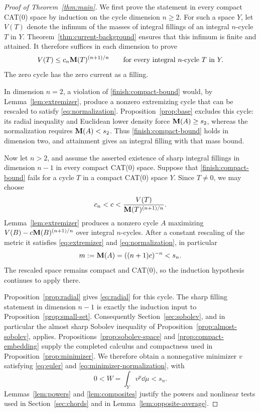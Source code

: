 \begin{proof}[Proof of Theorem~\ref{thm:main}]
We first prove the statement in every compact CAT(0) space by induction
on the cycle dimension \(n\ge2\). For such a space \(Y\), let
\(V(T)\) denote the infimum of the masses of integral fillings of an
integral \(n\)-cycle \(T\) in \(Y\). Theorem~\ref{thm:current-background}
ensures that this infimum is finite and attained. It therefore suffices
in each dimension to prove
\begin{equation}
 \label{finish:compact-bound}
 V(T)\le c_n\mathbf M(T)^{(n+1)/n}
 \qquad\text{for every integral }n\text{-cycle }T\text{ in }Y.
\end{equation}
The zero cycle has the zero current as a filling.

In dimension \(n=2\), a violation of
\eqref{finish:compact-bound} would, by Lemma~\ref{lem:extremizer},
produce a nonzero extremizing cycle that can be rescaled to satisfy
\eqref{eq:normalization}. Proposition~\ref{prop:base} excludes this
cycle: its radial inequality and Euclidean lower density force
\(\mathbf M(A)\ge s_2\), whereas the normalization requires
\(\mathbf M(A)<s_2\). Thus \eqref{finish:compact-bound} holds in
dimension two, and attainment gives an integral filling with that mass
bound.

Now let \(n>2\), and assume the asserted existence of sharp integral
fillings in dimension \(n-1\) in every compact CAT(0) space. Suppose
that \eqref{finish:compact-bound} fails for a cycle \(T\) in a compact
CAT(0) space \(Y\). Since \(T\ne0\), we may choose
\[
 c_n<c<\frac{V(T)}{\mathbf M(T)^{(n+1)/n}}.
\]
Lemma~\ref{lem:extremizer} produces a nonzero cycle \(A\) maximizing
\(V(B)-c\mathbf M(B)^{(n+1)/n}\) over integral \(n\)-cycles. After a constant
rescaling of the metric it satisfies \eqref{eq:extremizer} and
\eqref{eq:normalization}, in particular
\[
 m:=\mathbf M(A)=((n+1)c)^{-n}<s_n.
\]
The rescaled space remains compact and CAT(0), so the induction
hypothesis continues to apply there.

Proposition~\ref{prop:radial} gives \eqref{eq:radial} for this cycle.
The sharp filling statement in dimension \(n-1\) is exactly the
induction input to Proposition~\ref{prop:small-set}. Consequently
Section~\ref{sec:sobolev}, and in particular the almost sharp Sobolev
inequality of Proposition~\ref{prop:almost-sobolev}, applies.
Propositions~\ref{prop:sobolev-space} and
\ref{prop:compact-embedding} supply the completed calculus and
compactness used in Proposition~\ref{prop:minimizer}. We therefore
obtain a nonnegative minimizer \(v\) satisfying \eqref{eq:euler} and
\eqref{eq:minimizer-normalization}, with
\[
 0<W=\int_Yv^p\dd\mu<s_n.
\]
Lemmas~\ref{lem:powers} and \ref{lem:composites} justify the powers
and nonlinear tests used in Section~\ref{sec:chords} and in
Lemma~\ref{lem:opposite-average}.


\end{proof}
